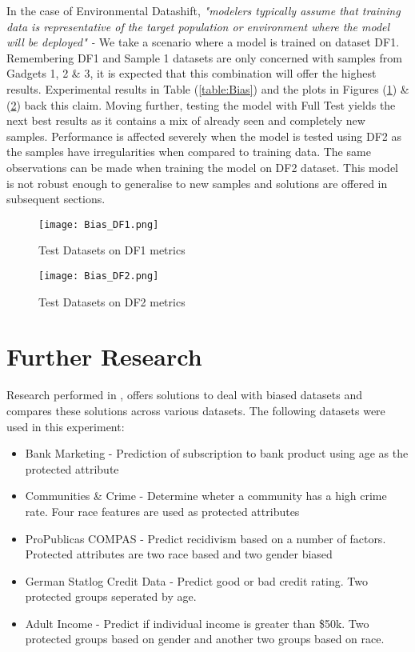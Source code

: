 \enlargethispage{\baselineskip}
In the case of Environmental Datashift,\textit{
"modelers typically assume that training data
is representative of the target population or environment where
the model will be deployed" - \cite{saria2019tutorial}}
We take a scenario where a model is trained on dataset DF1.
Remembering DF1 and Sample 1 datasets are only concerned with samples from Gadgets 1, 2 \& 3, it is expected that this combination will offer the highest results.
Experimental results in Table (\ref{table:Bias}) and the plots in Figures (\ref{fig:DF1}) \& (\ref{fig:DF2}) back this claim. 
Moving further, testing the model with Full Test yields the next best results as it contains a mix of already seen and completely new samples.   
Performance is affected severely when the model is tested using DF2 as the samples have irregularities when compared to training data.
The same observations can be made when training the model on DF2 dataset.
This model is not robust enough to generalise to new samples and solutions are offered in subsequent sections. 

\begin{figure}[H]
    \texttt{[image: Bias\_DF1.png]}
    \centering
    \caption{Test Datasets on DF1 metrics}
    \label{fig:DF1}
\end{figure}

\begin{figure}[H]
    \texttt{[image: Bias\_DF2.png]}
    \centering
    \caption{Test Datasets on DF2 metrics}
    \label{fig:DF2}
\end{figure}



\section{Further Research}
Research performed in \cite{Jiang}, offers solutions to deal with biased datasets and compares these solutions across various datasets.
The following datasets were used in this experiment:
\begin{itemize}
    \item Bank Marketing - Prediction of subscription to bank product using age as the protected attribute
    \item Communities \& Crime - Determine wheter a community has a high crime rate. Four race features are used as protected attributes
    \item ProPublicas COMPAS - Predict recidivism based on a number of factors. Protected attributes are two race based and two gender biased
    \item German Statlog Credit Data - Predict good or bad credit rating. Two protected groups seperated by age.
    \item Adult Income - Predict if individual income is greater than \$50k. Two protected groups based on gender and another two groups based on race.
\end{itemize}

